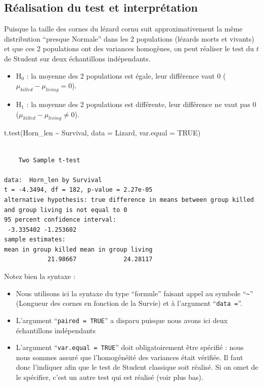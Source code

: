 \documentclass[
  a4paper,
  DIV=11,
  numbers=noendperiod,
  oneside]{scrreprt}
\newenvironment{Shaded}{}{}
\newcommand{\AttributeTok}[1]{\textcolor[rgb]{0.84,0.23,0.29}{#1}}
\newcommand{\ConstantTok}[1]{\textcolor[rgb]{0.00,0.36,0.77}{#1}}
\newcommand{\FunctionTok}[1]{\textcolor[rgb]{0.44,0.26,0.76}{#1}}
\newcommand{\NormalTok}[1]{\textcolor[rgb]{0.14,0.16,0.18}{#1}}
\newcommand{\SpecialCharTok}[1]{\textcolor[rgb]{0.00,0.36,0.77}{#1}}
\providecommand{\tightlist}{%
  \setlength{\itemsep}{0pt}\setlength{\parskip}{0pt}}\usepackage{longtable,booktabs,array}
\begin{document}
\hypertarget{sec-student}{%
\subsection{Réalisation du test et interprétation}\label{sec-student}}

Puisque la taille des cornes du lézard cornu suit approximativement la
même distribution ``presque Normale'' dans les 2 populations (lézards
morts et vivants) et que ces 2 populations ont des variances homogènes,
on peut réaliser le test du \(t\) de Student sur deux échantillons
indépendants.

\begin{itemize}
\tightlist
\item
  H\(_0\) : la moyenne des 2 populations est égale, leur différence vaut
  0 (\(\mu_{killed}-\mu_{living} = 0\)).
\item
  H\(_1\) : la moyenne des 2 populations est différente, leur différence
  ne vaut pas 0 (\(\mu_{killed}-\mu_{living} \neq 0\)).
\end{itemize}

\begin{Shaded}
\begin{Highlighting}[]
\FunctionTok{t.test}\NormalTok{(Horn\_len }\SpecialCharTok{\textasciitilde{}}\NormalTok{ Survival, }\AttributeTok{data =}\NormalTok{ Lizard, }\AttributeTok{var.equal =} \ConstantTok{TRUE}\NormalTok{)}
\end{Highlighting}
\end{Shaded}

\begin{verbatim}

    Two Sample t-test

data:  Horn_len by Survival
t = -4.3494, df = 182, p-value = 2.27e-05
alternative hypothesis: true difference in means between group killed and group living is not equal to 0
95 percent confidence interval:
 -3.335402 -1.253602
sample estimates:
mean in group killed mean in group living 
            21.98667             24.28117 
\end{verbatim}

Notez bien la syntaxe :

\begin{itemize}
\tightlist
\item
  Nous utilisons ici la syntaxe du type ``formule'' faisant appel au
  symbole ``\texttt{\textasciitilde{}}'' (Longueur des cornes en
  fonction de la Survie) et à l'argument ``\texttt{data\ =}''.
\item
  L'argument ``\texttt{paired\ =\ TRUE}'' a disparu puisque nous avons
  ici deux échantillons indépendants
\item
  L'argument ``\texttt{var.equal\ =\ TRUE}'' doit obligatoirement être
  spécifié : nous nous sommes assuré que l'homogénéité des variances
  était vérifiée. Il faut donc l'indiquer afin que le test de Student
  classique soit réalisé. Si on omet de le spécifier, c'est un autre
  test qui est réalisé (voir plus bas).
\end{itemize}
\end{document}
